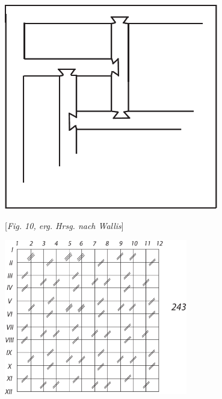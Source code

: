 \begin{minipage}[t]{0.5\textwidth}
\includegraphics[width=0.7\textwidth]{images/LH035,14,02_119v-d3.pdf}\\
\rule[-4mm]{0mm}{10mm}\noindent\centering\hspace*{-6mm}[\textit{Fig. 10, erg. Hrsg. nach Wallis}]
\end{minipage}
\pend
\vspace*{4.5em}
\pstart
\noindent\centering
\includegraphics[width=0.6\textwidth]{images/LH035,14,02_119v-d4.pdf}\\%
